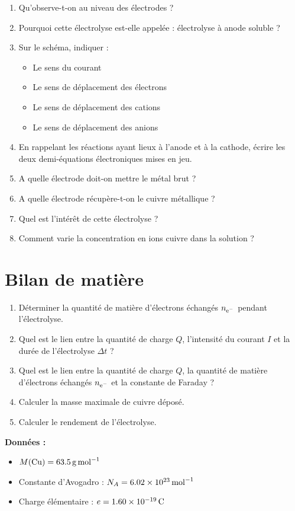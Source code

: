 \documentclass[a4paper,12pt,fleqn]{article}%
\begin{document}
\begin{enumerate}[resume]
	\item Qu'observe-t-on au niveau des électrodes ?
	\item Pourquoi cette électrolyse est-elle appelée : électrolyse à anode soluble ?
	\item Sur le schéma, indiquer :
		\begin{itemize}
			\item Le sens du courant
			\item Le sens de déplacement des électrons
			\item Le sens de déplacement des cations 
			\item Le sens de déplacement des anions 
		\end{itemize}
	\item En rappelant les réactions ayant lieux à l'anode et à la cathode, écrire les deux demi-équations électroniques mises en jeu.
	\item A quelle électrode doit-on mettre le métal brut ?
	\item A quelle électrode récupère-t-on le cuivre métallique ?
	\item Quel est l'intérêt de cette électrolyse ?
	\item Comment varie la concentration en ions cuivre dans la solution ?
\end{enumerate}

\section{Bilan de matière}
\begin{enumerate}[resume]
	\item Déterminer la quantité de matière d'électrons échangés $n_{\ce{e-}}$ pendant l'électrolyse.
	\item Quel est le lien entre la quantité de charge $Q$, l'intensité du courant $I$ et la durée de l'électrolyse $\Delta t$ ?
	\item Quel est le lien entre la quantité de charge $Q$, la quantité de matière d'électrons échangés $n_{\ce{e-}}$ et la constante de Faraday ?
	\item Calculer la masse maximale de cuivre déposé.
	\item Calculer le rendement de l'électrolyse.
\end{enumerate}

\textbf{Données :}
\begin{itemize}
	\item $M(\ce{Cu}) = \SI{63,5}{\gram\per\mole}$
	\item Constante d'Avogadro : $N_A = \SI{6,02E23}{\per\mole}$
	\item Charge élémentaire : $e=\SI{1,60E-19}{C}$
\end{itemize}
\end{document}
